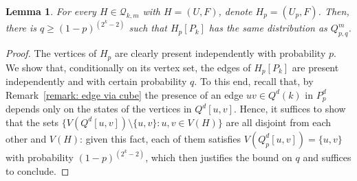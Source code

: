 \documentclass{article}
\newtheorem{lemma}[thm]{Lemma}
\theoremstyle{definition}
\newcommand{\cD}{\mathcal{D}}
\newcommand{\cQ}{\mathcal{Q}}
\begin{document}
\begin{lemma}\label{lem:reduction}
For every $H\in \cQ_{k,m}$ with $H=(U,F)$, denote $H_p=(U_p,F)$.
Then, there is $q\geq (1-p)^{(2^k-2)}$ such that $H_p[P_k]$ has the same distribution as $Q^m_{p,q}$.
\end{lemma}
\begin{proof}
The vertices of $H_p$ are clearly present independently with probability $p$.
We show that, conditionally on its vertex set, the edges of $H_p[P_k]$ are present independently and with certain probability $q$.
To this end, recall that, by Remark~\ref{remark: edge via cube} the presence of an edge $uv\in Q^d(k)$ in $P^d_p$ depends only on the states of the vertices in $Q^d[u,v]$.
Hence, it suffices to show that the sets $\{V(Q^d[u,v])\setminus\{u,v\}: u,v\in V(H)\}$ are all disjoint from each other and $V(H)$: given this fact, each of them satisfies $V(Q^d_p[u,v])=\{u,v\}$ with probability $(1-p)^{(2^k-2)}$, which then justifies the bound on $q$ and suffices to conclude.



\end{proof}
\end{document}
